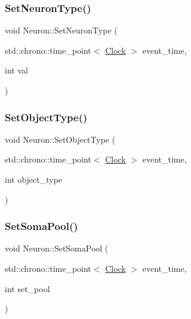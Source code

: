 \mbox{\label{classNeuron_afc685a0444425fceab6685a6ee004b65}} 
\subsubsection{\texorpdfstring{Set\+Neuron\+Type()}{SetNeuronType()}}
{\footnotesize\ttfamily void Neuron\+::\+Set\+Neuron\+Type (\begin{DoxyParamCaption}\item[{std\+::chrono\+::time\+\_\+point$<$ \mbox{\hyperlink{universe_8h_a0ef8d951d1ca5ab3cfaf7ab4c7a6fd80}{Clock}} $>$}]{event\+\_\+time,  }\item[{int}]{val }\end{DoxyParamCaption})\hspace{0.3cm}{\ttfamily [inline]}}

\mbox{\label{classNeuron_ab371e2dacf2cdde8db5547b72fb45ca1}} 
\subsubsection{\texorpdfstring{Set\+Object\+Type()}{SetObjectType()}}
{\footnotesize\ttfamily void Neuron\+::\+Set\+Object\+Type (\begin{DoxyParamCaption}\item[{std\+::chrono\+::time\+\_\+point$<$ \mbox{\hyperlink{universe_8h_a0ef8d951d1ca5ab3cfaf7ab4c7a6fd80}{Clock}} $>$}]{event\+\_\+time,  }\item[{int}]{object\+\_\+type }\end{DoxyParamCaption})}

\mbox{\label{classNeuron_ae18e23983d02953fa6886bef0bbeb339}} 
\subsubsection{\texorpdfstring{Set\+Soma\+Pool()}{SetSomaPool()}}
{\footnotesize\ttfamily void Neuron\+::\+Set\+Soma\+Pool (\begin{DoxyParamCaption}\item[{std\+::chrono\+::time\+\_\+point$<$ \mbox{\hyperlink{universe_8h_a0ef8d951d1ca5ab3cfaf7ab4c7a6fd80}{Clock}} $>$}]{event\+\_\+time,  }\item[{int}]{set\+\_\+pool }\end{DoxyParamCaption})\hspace{0.3cm}{\ttfamily [inline]}}


